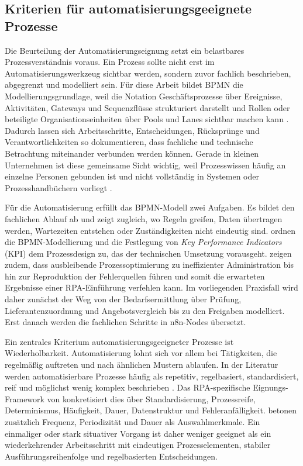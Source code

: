 \documentclass[a4paper,12pt]{article}
\begin{document}
\subsection{Kriterien für automatisierungsgeeignete Prozesse}
Die Beurteilung der Automatisierungseignung setzt ein belastbares Prozessverständnis voraus. Ein Prozess sollte nicht erst im Automatisierungswerkzeug sichtbar werden, sondern zuvor fachlich beschrieben, abgegrenzt und modelliert sein. Für diese Arbeit bildet BPMN die Modellierungsgrundlage, weil die Notation Geschäftsprozesse über Ereignisse, Aktivitäten, Gateways und Sequenzflüsse strukturiert darstellt und Rollen oder beteiligte Organisationseinheiten über Pools und Lanes sichtbar machen kann \parencite{object_management_group_bpmn_2014}. Dadurch lassen sich Arbeitsschritte, Entscheidungen, Rücksprünge und Verantwortlichkeiten so dokumentieren, dass fachliche und technische Betrachtung miteinander verbunden werden können. Gerade in kleinen Unternehmen ist diese gemeinsame Sicht wichtig, weil Prozesswissen häufig an einzelne Personen gebunden ist und nicht vollständig in Systemen oder Prozesshandbüchern vorliegt \parencite{beuchel_digitalisierung_2024,moreira_methodology_2025}.

Für die Automatisierung erfüllt das BPMN-Modell zwei Aufgaben. Es bildet den fachlichen Ablauf ab und zeigt zugleich, wo Regeln greifen, Daten übertragen werden, Wartezeiten entstehen oder Zuständigkeiten nicht eindeutig sind. \Textcite{moreira_methodology_2025} ordnen die BPMN-Modellierung und die Festlegung von \textit{Key Performance Indicators} (KPI) dem Prozessdesign zu, das der technischen Umsetzung vorausgeht. \Textcite{stravinskiene_process_2021} zeigen zudem, dass ausbleibende Prozessoptimierung zu ineffizienter Administration bis hin zur Reproduktion der Fehlerquellen führen und somit die erwarteten Ergebnisse einer RPA-Einführung verfehlen kann. Im vorliegenden Praxisfall wird daher zunächst der Weg von der Bedarfsermittlung über Prüfung, Lieferantenzuordnung und Angebotsvergleich bis zu den Freigaben modelliert. Erst danach werden die fachlichen Schritte in n8n-Nodes übersetzt.

Ein zentrales Kriterium automatisierungsgeeigneter Prozesse ist Wiederholbarkeit. Automatisierung lohnt sich vor allem bei Tätigkeiten, die regelmäßig auftreten und nach ähnlichen Mustern ablaufen. In der Literatur werden automatisierbare Prozesse häufig als repetitiv, regelbasiert, standardisiert, reif und möglichst wenig komplex beschrieben \parencite{moreira_business_2024}. Das RPA-spezifische Eignungs-Framework von \textcite{wellmann_framework_2020} konkretisiert dies über Standardisierung, Prozessreife, Determinismus, Häufigkeit, Dauer, Datenstruktur und Fehleranfälligkeit. \Textcite{choi_candidate_2021} betonen zusätzlich Frequenz, Periodizität und Dauer als Auswahlmerkmale. Ein einmaliger oder stark situativer Vorgang ist daher weniger geeignet als ein wiederkehrender Arbeitsschritt mit eindeutigen Prozesselementen, stabiler Ausführungsreihenfolge und regelbasierten Entscheidungen.
\end{document}
